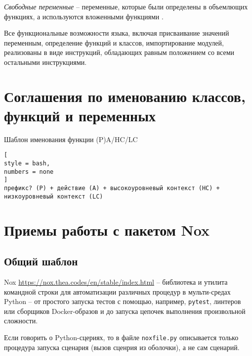 \documentclass[%
	11pt,
	a4paper,
	utf8,
		]{article}
\begin{document}
\emph{Свободные переменные} -- переменные, которые были определены в объемлющих функциях, а используются вложенными функциями \cite[]{beazley:python-2010}.

Все функциональные возможности языка, включая присваивание значений переменным, определение функций и классов, импортирование модулей, реализованы в виде инструкций, обладающих равным положением со всеми остальными инструкциями.

\section{Соглашения по именованию классов, функций и переменных}

Шаблон именования функции (P)A/HC/LC
\begin{lstlisting}[
style = bash,
numbers = none
]
префикс? (P) + действие (A) + высокоуровневый контекст (HC) + низкоуровневый контекст (LC)
\end{lstlisting}

\section{Приемы работы с пакетом Nox}

\subsection{Общий шаблон}

Nox \url{https://nox.thea.codes/en/stable/index.html} -- библиотека и утилита командной строки для автоматизации различных процедур в мульти-средах Python -- от простого запуска тестов с помощью, например, \verb|pytest|, линтеров или сборщиков Docker-образов и до запуска цепочек выполнения произвольной сложности.

Если говорить о Python-сцериях, то в файле \verb|noxfile.py| описывается только процедура запуска сценария (вызов сценрия из оболочки), а не сам сценарий.
\end{document}
